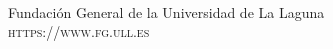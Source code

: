 \documentclass[12pt,fleqn]{book}
\begin{document}

\newpage
~\vfill
\thispagestyle{empty}

\noindent Fundación General de la Universidad de La Laguna\\ %


\noindent \textsc{https://www.fg.ull.es}\\ %






\pagestyle{empty} %

\tableofcontents %

\cleardoublepage %

\pagestyle{fancy} %

\end{document}
